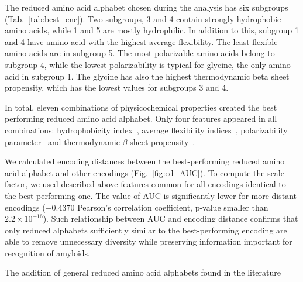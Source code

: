 \documentclass{bioinfo}
\begin{document}
%
%
The reduced amino acid alphabet chosen during the analysis has six subgroups 
(Tab.~\ref{tab:best_enc}). Two subgroups, 3 and 4 contain strongly hydrophobic 
amino acids, while 1 and 5 are mostly hydrophilic. In addition to this, subgroup 
1 and 4 have amino acid with the highest average flexibility. The least flexible 
amino acids are in subgroup 5. The most polarizable amino acids belong to 
subgroup 4, while the lowest polarizability is typical for glycine, the only 
amino acid in subgroup 1. The glycine has also the highest thermodynamic beta 
sheet propensity, which has the lowest values for subgroups 3 and 4.

  In total, eleven combinations of physicochemical properties created the best 
performing reduced amino acid alphabet. Only four features appeared in all 
combinations: hydrophobicity index~\citep{argos_structural_1982}, average 
flexibility indices~\citep{bhaskaran_positional_1988}, polarizability 
parameter~\citep{charton_structural_1982} and thermodynamic $\beta$-sheet 
propensity~\citep{kim_thermodynamic_1993}.

  We calculated encoding distances between the best-performing reduced amino 
acid alphabet and other encodings (Fig.~\ref{fig:ed_AUC}). To compute the scale 
factor, we used described above features common for all encodings identical to 
the best-performing one. The value of AUC is significantly lower for more 
%
%
%
%
%
distant encodings ($-0.4370$ Pearson's correlation coefficient, p-value smaller 
than $2.2 \times 10^{-16}$). Such relationship between AUC and encoding distance 
confirms that only reduced alphabets sufficiently similar to the best-performing 
encoding are able to remove unnecessary diversity while preserving information 
important for recognition of amyloids.

  The addition of general reduced amino acid alphabets found in the literature 
\end{document}
